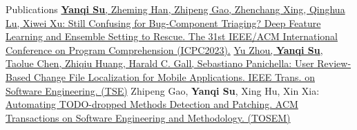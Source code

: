 \documentclass[
	11pt, %
]{resume} %
\begin{document}
\begin{rSection}{Publications}
\href{https://ieeexplore.ieee.org/document/10174001}{\textbf{Yanqi Su}, Zheming Han, Zhipeng Gao, Zhenchang Xing, Qinghua Lu, Xiwei Xu:
Still Confusing for Bug-Component Triaging? Deep Feature Learning and Ensemble Setting to Rescue. The 31st IEEE/ACM International Conference on Program Comprehension (ICPC2023).} 
\newline\newline
\href{https://ieeexplore.ieee.org/document/8961125}{Yu Zhou, \textbf{Yanqi Su}, Taolue Chen, Zhiqiu Huang, Harald C. Gall, Sebastiano Panichella:
User Review-Based Change File Localization for Mobile Applications. IEEE Trans. on Software Engineering. (TSE)}\newline\newline
Zhipeng Gao, \textbf{Yanqi Su}, Xing Hu, Xin Xia: \href{https://dl.acm.org/doi/10.1145/3700793}{Automating TODO-dropped Methods Detection and Patching. ACM Transactions on Software Engineering and Methodology. (TOSEM)} 
\end{rSection}
\end{document}
